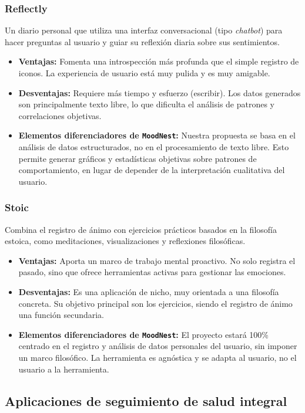 \subsubsection{Reflectly \cite{app:reflectly}}
Un diario personal que utiliza una interfaz conversacional (tipo \textit{chatbot}) para hacer preguntas al usuario y guiar su reflexión diaria sobre sus sentimientos.
\begin{itemize}
    \item \textbf{Ventajas:} Fomenta una introspección más profunda que el simple registro de iconos. La experiencia de usuario está muy pulida y es muy amigable.
    \item \textbf{Desventajas:} Requiere más tiempo y esfuerzo (escribir). Los datos generados son principalmente texto libre, lo que dificulta el análisis de patrones y correlaciones objetivas.
    \item \textbf{Elementos diferenciadores de \texttt{MoodNest}:} Nuestra propuesta se basa en el análisis de datos estructurados, no en el procesamiento de texto libre. Esto permite generar gráficos y estadísticas objetivas sobre patrones de comportamiento, en lugar de depender de la interpretación cualitativa del usuario.
\end{itemize}

\subsubsection{Stoic \cite{app:stoic}}
Combina el registro de ánimo con ejercicios prácticos basados en la filosofía estoica, como meditaciones, visualizaciones y reflexiones filosóficas.
\begin{itemize}
    \item \textbf{Ventajas:} Aporta un marco de trabajo mental proactivo. No solo registra el pasado, sino que ofrece herramientas activas para gestionar las emociones.
    \item \textbf{Desventajas:} Es una aplicación de nicho, muy orientada a una filosofía concreta. Su objetivo principal son los ejercicios, siendo el registro de ánimo una función secundaria.
    \item \textbf{Elementos diferenciadores de \texttt{MoodNest}:} El proyecto estará 100\% centrado en el registro y análisis de datos personales del usuario, sin imponer un marco filosófico. La herramienta es agnóstica y se adapta al usuario, no el usuario a la herramienta.
\end{itemize}

\subsection{Aplicaciones de seguimiento de salud integral}

